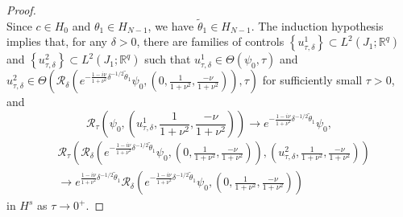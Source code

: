 \documentclass[10pt,a4paper]{amsart}
\begin{document}
\begin{proof}
\begin{equation*}
\end{equation*}
Since $ c\in H_0$ and $\theta_1\in H_{N-1} $, we have $ \tilde{\theta}_1\in H_{N-1} $. 
The induction hypothesis implies that, for any $\delta>0$, there are families of controls $\left\{u_{\tau, \delta}^1\right\} \subset L^2\left(J_1 ; \mathbb{R}^q\right)$ and $\left\{u_{\tau, \delta}^2\right\} \subset L^2\left(J_1 ; \mathbb{R}^q\right)$ such that $u_{\tau, \delta}^1 \in \Theta\left(\psi_0, \tau\right)$ and $u_{\tau, \delta}^2 \in \Theta\left(\mathcal{R}_\delta\left(e^{-\frac{1-i\nu}{1+\nu^2} \delta^{-1 / 2} \tilde{\theta}_1} \psi_0, \left(0,\frac{1}{1+\nu^2},\frac{-\nu}{1+\nu^2}\right)\right), \tau\right)$ for sufficiently small $\tau>0$, and
\begin{equation*}\label{(2.5)}
\mathcal{R}_\tau\left(\psi_0, \left(u_{\tau, \delta}^1,\frac{1}{1+\nu^2},\frac{-\nu}{1+\nu^2}\right)\right) \rightarrow e^{-\frac{1-i\nu}{1+\nu^2} \delta^{-1 / 2} \tilde{\theta}_1} \psi_0,
\end{equation*}
\begin{align}
&\mathcal{R}_\tau\left(\mathcal{R}_\delta\left(e^{-\frac{1-i\nu}{1+\nu^2} \delta^{-1 / 2} \tilde{\theta}_1} \psi_0, \left(0,\frac{1}{1+\nu^2},\frac{-\nu}{1+\nu^2}\right)\right), \left(u_{\tau, \delta}^2,\frac{1}{1+\nu^2},\frac{-\nu}{1+\nu^2}\right)\right) \nonumber\\
 &\rightarrow e^{\frac{1-i\nu}{1+\nu^2} \delta^{-1 / 2} \tilde{\theta}_1} \mathcal{R}_\delta\left(e^{-\frac{1-i\nu}{1+\nu^2} \delta^{-1 / 2} \tilde{\theta}_1} \psi_0, \left(0,\frac{1}{1+\nu^2},\frac{-\nu}{1+\nu^2}\right)\right) \nonumber\label{(2.6)}
\end{align}
in $H^s$ as $\tau \rightarrow 0^{+}$. 


\end{proof}
\end{document}
